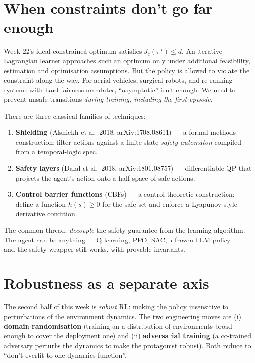 \documentclass[11pt,oneside]{scrbook}
\begin{document}
\section{When constraints don't go far enough}

Week 22's ideal constrained optimum satisfies $J_c(\pi^\star)\leq d$. An iterative Lagrangian learner approaches such an optimum only under additional feasibility, estimation and optimisation assumptions. But the policy is allowed to violate the
constraint along the way. For aerial vehicles, surgical robots, and
re-ranking systems with hard fairness mandates, ``asymptotic'' isn't enough.
We need to prevent unsafe transitions \emph{during training, including the
first episode}.

There are three classical families of techniques:
\begin{enumerate}[leftmargin=*]
  \item \textbf{Shielding} (Alshiekh et al.\ 2018, arXiv:1708.08611) ---
        a formal-methods construction: filter actions against a finite-state
        \emph{safety automaton} compiled from a temporal-logic spec.
  \item \textbf{Safety layers} (Dalal et al.\ 2018, arXiv:1801.08757) ---
        differentiable QP that projects the agent's action onto a half-space
        of safe actions.
  \item \textbf{Control barrier functions} (CBFs) --- a control-theoretic
        construction: define a function $h(s) \geq 0$ for the safe set and
        enforce a Lyapunov-style derivative condition.
\end{enumerate}

The common thread: \emph{decouple} the safety guarantee from the learning
algorithm. The agent can be anything --- Q-learning, PPO, SAC, a frozen
LLM-policy --- and the safety wrapper still works, with provable invariants.

\section{Robustness as a separate axis}

The second half of this week is \emph{robust} RL: making the policy
insensitive to perturbations of the environment dynamics. The two engineering
moves are
(i) \textbf{domain randomisation} (training on a distribution of environments
broad enough to cover the deployment one) and
(ii) \textbf{adversarial training} (a co-trained adversary perturbs the
dynamics to make the protagonist robust). Both reduce to ``don't overfit to
one dynamics function''.
\end{document}
